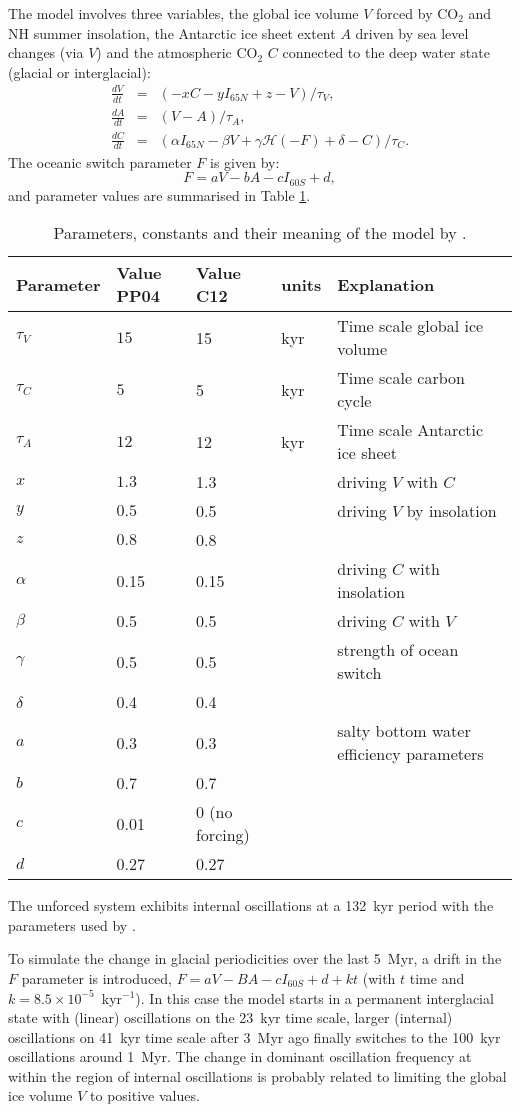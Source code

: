 \documentclass[12pt]{article}
\def\be{\begin{equation}}
\def\ee{\end{equation}}
\def\ba{\begin{eqnarray}}
\def\ea{\end{eqnarray}}
\begin{document}
The model involves three variables, the global ice volume $V$ forced by CO$_2$ and NH summer insolation, the Antarctic ice sheet extent $A$ driven by sea level changes (via $V$) and the atmospheric CO$_2$ $C$ connected to the deep water state (glacial or interglacial):
\ba
\frac{dV}{dt} &=& \left(-xC-yI_{65N}+z-V\right)/\tau_{V},\\
\frac{dA}{dt} &=& \left(V-A\right)/\tau_{A},\\
\frac{dC}{dt} &=& \left(\alpha I_{65N}-\beta V + \gamma \mathcal{H}(-F)+\delta-C\right)/\tau_C.
\label{e:PP04}
\ea
The oceanic switch parameter $F$ is given by:
\be
F = a V - b A - c I_{60S} + d,
\ee
and parameter values are summarised in Table \ref{t:PP04}.
\begin{table}[h!]
\small{
\begin{tabular}{lllll}
\hline
Parameter & Value PP04 & Value C12 & units & Explanation\\
\hline
$\tau_V$ & $15$ & 15 & kyr &  Time scale global ice volume\\
$\tau_C$ & $5$ & 5 & kyr & Time scale carbon cycle\\
$\tau_A$ & $12$ & 12 & kyr & Time scale Antarctic ice sheet\\
$x$ & $1.3$ & 1.3 & & driving $V$ with $C$ \\
$y$ & $0.5$& 0.5 & & driving $V$ by insolation\\
$z$ & $0.8$ & 0.8 & & \\
$\alpha$ & 0.15& 0.15 & & driving $C$ with insolation \\
$\beta$ & 0.5 & 0.5 & & driving $C$ with $V$ \\
$\gamma$ & 0.5 & 0.5 & & strength of ocean switch\\
$\delta$ & 0.4 & 0.4 & & \\
$a$ & 0.3 & 0.3 & & salty bottom water efficiency parameters \\
$b$ & 0.7 & 0.7 & & \\
$c$ & 0.01 & 0 (no forcing) & & \\
$d$ & 0.27 & 0.27 & & \\
\hline
\end{tabular}}
\label{t:PP04}
\caption{Parameters, constants and their meaning of the model by \cite{Paillard:2004dn}. }
\end{table}

The unforced system exhibits internal oscillations at a 132~kyr period with the parameters used by \cite{Paillard:2004dn}. 

To simulate the change in glacial periodicities over the last 5~Myr, a drift in the $F$ parameter is introduced, $F=aV-BA-cI_{60S}+d+kt$ (with $t$ time and $k=8.5\times 10^{-5}$~kyr$^{-1}$). In this case the model starts in a permanent interglacial state with (linear) oscillations on the 23~kyr time scale, larger (internal) oscillations on 41~kyr time scale after 3~Myr ago finally switches to the 100~kyr oscillations around 1~Myr. The change in dominant oscillation frequency at within the region of internal oscillations is probably related to limiting the global ice volume $V$ to positive values. 
\end{document}
